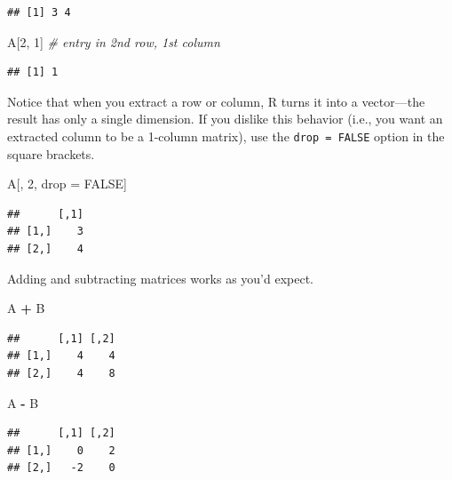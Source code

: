 \documentclass[12pt,oneside,openany]{book}
\newenvironment{Shaded}{\begin{snugshade}}{\end{snugshade}}
\newcommand{\DecValTok}[1]{\textcolor[rgb]{0.00,0.00,0.81}{#1}}
\newcommand{\StringTok}[1]{\textcolor[rgb]{0.31,0.60,0.02}{#1}}
\newcommand{\CommentTok}[1]{\textcolor[rgb]{0.56,0.35,0.01}{\textit{#1}}}
\newcommand{\OtherTok}[1]{\textcolor[rgb]{0.56,0.35,0.01}{#1}}
\newcommand{\OperatorTok}[1]{\textcolor[rgb]{0.81,0.36,0.00}{\textbf{#1}}}
\newcommand{\NormalTok}[1]{#1}
\begin{document}
\begin{verbatim}
## [1] 3 4
\end{verbatim}

\begin{Shaded}
\begin{Highlighting}[]
\NormalTok{A[}\DecValTok{2}\NormalTok{, }\DecValTok{1}\NormalTok{]  }\CommentTok{# entry in 2nd row, 1st column}
\end{Highlighting}
\end{Shaded}

\begin{verbatim}
## [1] 1
\end{verbatim}

Notice that when you extract a row or column, R turns it into a
vector---the result has only a single dimension. If you dislike this
behavior (i.e., you want an extracted column to be a 1-column matrix),
use the \texttt{drop\ =\ FALSE} option in the square brackets.

\begin{Shaded}
\begin{Highlighting}[]
\NormalTok{A[, }\DecValTok{2}\NormalTok{, drop =}\StringTok{ }\OtherTok{FALSE}\NormalTok{]}
\end{Highlighting}
\end{Shaded}

\begin{verbatim}
##      [,1]
## [1,]    3
## [2,]    4
\end{verbatim}

Adding and subtracting matrices works as you'd expect.

\begin{Shaded}
\begin{Highlighting}[]
\NormalTok{A }\OperatorTok{+}\StringTok{ }\NormalTok{B}
\end{Highlighting}
\end{Shaded}

\begin{verbatim}
##      [,1] [,2]
## [1,]    4    4
## [2,]    4    8
\end{verbatim}

\begin{Shaded}
\begin{Highlighting}[]
\NormalTok{A }\OperatorTok{-}\StringTok{ }\NormalTok{B}
\end{Highlighting}
\end{Shaded}

\begin{verbatim}
##      [,1] [,2]
## [1,]    0    2
## [2,]   -2    0
\end{verbatim}
\end{document}
